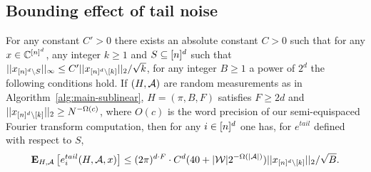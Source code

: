 \subsection{Bounding effect of tail noise}\label{sec:tail-noise}


\begin{lemma}\label{lm:loc-tail-small-single-H}
For any constant $C'>0$ there exists an absolute constant $C>0$ such that for any $x\in \mathbb{C}^{{[n]^d}}$, any integer $k\geq 1$ and $S\subseteq {[n]^d}$ such that $||x_{{[n]^d}\setminus S}||_\infty\leq C'||x_{{[n]^d}\setminus [k]}||_2/\sqrt{k}$, for any integer $B\geq 1$ a power of $2^d$ the following conditions hold.
If $(H, {\mathcal{A}})$ are random measurements as in Algorithm~\ref{alg:main-sublinear}, $H=(\pi, B, F)$ satisfies $F\geq 2d$ and $||x_{{[n]^d}\setminus [k]}||_2\geq N^{-\Omega(c)}$, where $O(c)$ is the word precision of our semi-equispaced Fourier transform computation, then for any $i\in {[n]^d}$ one has, for $e^{tail}$ defined with respect to $S$, 
$$
{\bf \mbox{\bf E}}_{H, {\mathcal{A}}}\left[e^{tail}_{i}(H, {\mathcal{A}}, x)\right]\leq  (2\pi)^{d\cdot F} \cdot C^d(40+|\mathcal{W}|2^{-\Omega(|{\mathcal{A}}|)})  ||x_{{[n]^d} \setminus [k]}||_2/\sqrt{B}.
$$ 
\end{lemma}
